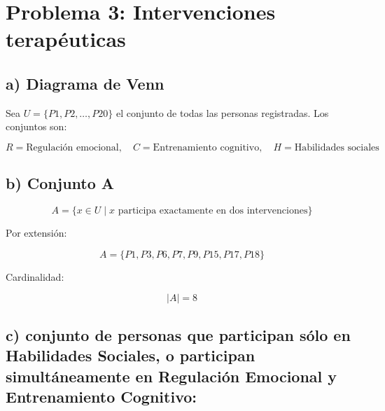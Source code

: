 \documentclass{article}
\begin{document}
	
	\section*{Problema 3: Intervenciones terapéuticas}
	
	\subsection*{a) Diagrama de Venn}
	
	Sea $U = \{P1, P2, \dots, P20\}$ el conjunto de todas las personas registradas.  
	Los conjuntos son:
	
	
	\[
	R = \text{Regulación emocional}, \quad
	C = \text{Entrenamiento cognitivo}, \quad
	H = \text{Habilidades sociales}
	\]
	
	\begin{center}
	\end{center}
	
	\subsection*{b) Conjunto A}
	
	
	
	\[
	A = \{x \in U \mid x \text{ participa exactamente en dos intervenciones}\}
	\]
	
	
	
	Por extensión:
	
	
	\[
	A = \{P1, P3, P6, P7, P9, P15, P17, P18\}
	\]
	
	
	
	Cardinalidad:
	
	
	\[
	|A| = 8
	\]
	
	
	
	\subsection*{c) conjunto de personas que participan sólo en Habilidades Sociales, o participan simultáneamente en Regulación Emocional y Entrenamiento Cognitivo:} 
		
\end{document}
